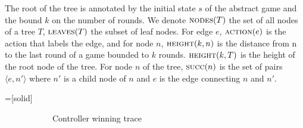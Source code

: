 The root of the tree is annotated by the initial state $s$ of the abstract game
and the bound $k$ on the number of rounds.  We denote $\textsc{nodes}(T)$ the
set of all nodes of a tree $T$, $\textsc{leaves}(T)$ the subset of leaf nodes.
For edge $e$, $\textsc{action}(e)$ is the action that labels the edge, and for
node $n$, $\textsc{height}(k, n)$ is the distance from n to the last round of a
game bounded to $k$ rounds.  $\textsc{height}(k, T)$ is the height of the root
node of the tree.  For node $n$ of the tree, $\textsc{succ}(n)$ is the set of
pairs $\langle e, n' \rangle$ where $n'$ is a child node of $n$ and $e$ is the
edge connecting $n$ and $n'$.

=[solid]
\begin{figure}
    \centering
    \captionsetup[subfigure]{width=\textwidth,justification=raggedleft}
    \begin{subfigure}[t]{.2\textwidth}
        \centering
        \begin{minipage}[t][3.8cm][t]{\textwidth}
    \end{minipage}
        \caption{Controller winning trace}
        \label{fig:trace}
    \end{subfigure}
    \begin{subfigure}[t]{.2\textwidth}
        \centering
        \begin{minipage}[t][3.8cm][t]{\textwidth}
        \begin{tikzpicture}[dash pattern = on 2pt off 2pt, level distance = 10mm,baseline]

\end{tikzpicture}
\end{minipage}
\end{subfigure}
\end{figure}
